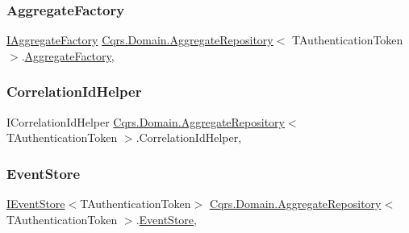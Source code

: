 \subsubsection{\texorpdfstring{Aggregate\+Factory}{AggregateFactory}}
{\footnotesize\ttfamily \hyperlink{interfaceCqrs_1_1Domain_1_1Factories_1_1IAggregateFactory}{I\+Aggregate\+Factory} \hyperlink{classCqrs_1_1Domain_1_1AggregateRepository}{Cqrs.\+Domain.\+Aggregate\+Repository}$<$ T\+Authentication\+Token $>$.\hyperlink{classCqrs_1_1Domain_1_1Factories_1_1AggregateFactory}{Aggregate\+Factory}\hspace{0.3cm}{\ttfamily [get]}, {\ttfamily [protected]}}

\mbox{\label{classCqrs_1_1Domain_1_1AggregateRepository_a758d2fd5c0cf30bc038a996800421fd0}} 
\subsubsection{\texorpdfstring{Correlation\+Id\+Helper}{CorrelationIdHelper}}
{\footnotesize\ttfamily I\+Correlation\+Id\+Helper \hyperlink{classCqrs_1_1Domain_1_1AggregateRepository}{Cqrs.\+Domain.\+Aggregate\+Repository}$<$ T\+Authentication\+Token $>$.Correlation\+Id\+Helper\hspace{0.3cm}{\ttfamily [get]}, {\ttfamily [protected]}}

\mbox{\label{classCqrs_1_1Domain_1_1AggregateRepository_a99c8546ada9058c0488727b01c626528}} 
\subsubsection{\texorpdfstring{Event\+Store}{EventStore}}
{\footnotesize\ttfamily \hyperlink{interfaceCqrs_1_1Events_1_1IEventStore}{I\+Event\+Store}$<$T\+Authentication\+Token$>$ \hyperlink{classCqrs_1_1Domain_1_1AggregateRepository}{Cqrs.\+Domain.\+Aggregate\+Repository}$<$ T\+Authentication\+Token $>$.\hyperlink{classCqrs_1_1Events_1_1EventStore}{Event\+Store}\hspace{0.3cm}{\ttfamily [get]}, {\ttfamily [protected]}}

